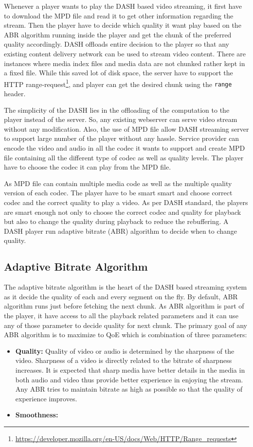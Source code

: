 Whenever a player wants to play the DASH based video streaming, it first have to download the MPD file and read it to get other information regarding the stream. Then the player have to decide which quality it want play based on the ABR algorithm running inside the player and get the chunk of the preferred quality accordingly. DASH offloads entire decision to the player so that any existing content delivery network can be used to stream video content. There are instances where media index files and media data are not chunked rather kept in a fixed file. While this saved lot of disk space, the server have to support the HTTP range-request\footnote{\url{https://developer.mozilla.org/en-US/docs/Web/HTTP/Range_requests}}, and player can get the desired chunk using the {\tt range} header.

The simplicity of the DASH lies in the offloading of the computation to the player instead of the server. So, any existing webserver can serve video stream without any modification. Also, the use of MPD file allow DASH streaming server to support large number of the player without any hassle. Service provider can encode the video and audio in all the codec it wants to support and create MPD file containing all the different type of codec as well as quality levels. The player have to choose the codec it can play from the MPD file.

As MPD file can contain multiple media code as well as the multiple quality version of each codec. The player have to be smart smart and choose correct codec and the correct quality to play a video. As per DASH standard, the players are smart enough not only to choose the correct codec and quality for playback but also to change the quality during playback to reduce the rebuffering. A DASH player run adaptive bitrate (ABR) algorithm to decide when to change quality.

\subsection{Adaptive Bitrate Algorithm}
The adaptive bitrate algorithm is the heart of the DASH based streaming system as it decide the quality of each and every segment on the fly. By default, ABR algorithm runs just before fetching the next chunk. As ABR algorithm is part of the player, it have access to all the playback related parameters and it can use any of those parameter to decide quality for next chunk. The primary goal of any ABR algorithm is to maximize to QoE which is combination of three parameters:
\begin{itemize}
	\item {\bf Quality:} Quality of video or audio is determined by the sharpness of the video. Sharpness of a video is directly related to the bitrate of sharpness increases. It is expected that sharp media have better details in the media in both audio and video thus provide better experience in enjoying the stream. Any ABR tries to maintain bitrate as high as possible so that the quality of experience improves.
	\item{\bf Smoothness:}
\end{itemize}

